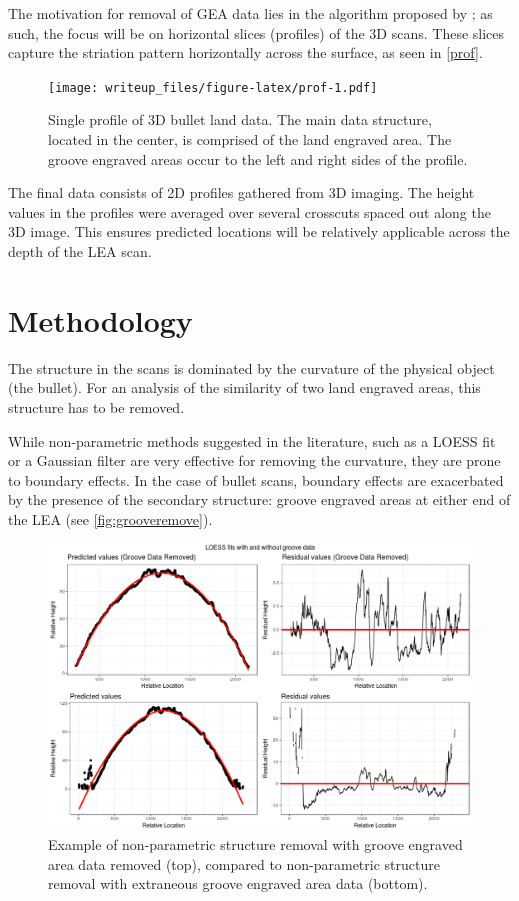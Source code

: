 \documentclass[]{article}
\begin{document}
The motivation for removal of GEA data lies in the algorithm proposed by
\citet{Hare1}; as such, the focus will be on horizontal slices
(profiles) of the 3D scans. These slices capture the striation pattern
horizontally across the surface, as seen in \autoref{prof}.

\begin{figure}
\centering
\texttt{[image: writeup\_files/figure-latex/prof-1.pdf]}
\caption{\label{prof}Single profile of 3D bullet land data. The main
data structure, located in the center, is comprised of the land engraved
area. The groove engraved areas occur to the left and right sides of the
profile.}
\end{figure}

The final data consists of 2D profiles gathered from 3D imaging. The
height values in the profiles were averaged over several crosscuts
spaced out along the 3D image. This ensures predicted locations will be
relatively applicable across the depth of the LEA scan.

\section{Methodology}

The structure in the scans is dominated by the curvature of the physical
object (the bullet). For an analysis of the similarity of two land
engraved areas, this structure has to be removed.

While non-parametric methods suggested in the literature, such as a
LOESS fit \citep{Hare1} or a Gaussian filter \citep{Chu1} are very
effective for removing the curvature, they are prone to boundary
effects. In the case of bullet scans, boundary effects are exacerbated
by the presence of the secondary structure: groove engraved areas at
either end of the LEA (see \autoref{fig:grooveremove}).

\begin{figure}
\includegraphics[width=1\linewidth]{images/groove_vs_nogroove} \caption{Example of non-parametric structure removal with groove engraved area data removed (top), compared to non-parametric structure removal with extraneous groove engraved area data (bottom).}\label{fig:grooveremove}
\end{figure}
\end{document}
